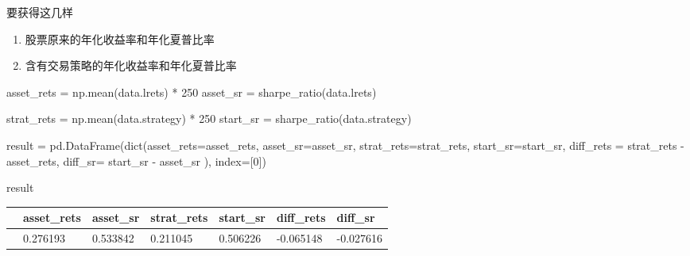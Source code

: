 \documentclass[
  letterpaper,
  DIV=11,
  numbers=noendperiod]{scrreprt}
\newenvironment{Shaded}{\begin{snugshade}}{\end{snugshade}}
\newcommand{\BuiltInTok}[1]{\textcolor[rgb]{0.00,0.23,0.31}{#1}}
\newcommand{\DecValTok}[1]{\textcolor[rgb]{0.68,0.00,0.00}{#1}}
\newcommand{\NormalTok}[1]{\textcolor[rgb]{0.00,0.23,0.31}{#1}}
\newcommand{\OperatorTok}[1]{\textcolor[rgb]{0.37,0.37,0.37}{#1}}
\providecommand{\tightlist}{%
  \setlength{\itemsep}{0pt}\setlength{\parskip}{0pt}}\usepackage{longtable,booktabs,array}
\begin{document}
要获得这几样

\begin{enumerate}
\def\labelenumi{\arabic{enumi}.}
\tightlist
\item
  股票原来的年化收益率和年化夏普比率
\item
  含有交易策略的年化收益率和年化夏普比率
\end{enumerate}

\begin{Shaded}
\begin{Highlighting}[]
\NormalTok{asset\_rets }\OperatorTok{=}\NormalTok{ np.mean(data.lrets) }\OperatorTok{*} \DecValTok{250}
\NormalTok{asset\_sr }\OperatorTok{=}\NormalTok{ sharpe\_ratio(data.lrets)}

\NormalTok{strat\_rets }\OperatorTok{=}\NormalTok{ np.mean(data.strategy) }\OperatorTok{*} \DecValTok{250}
\NormalTok{start\_sr }\OperatorTok{=}\NormalTok{ sharpe\_ratio(data.strategy)}

\NormalTok{result }\OperatorTok{=}\NormalTok{ pd.DataFrame(}\BuiltInTok{dict}\NormalTok{(asset\_rets}\OperatorTok{=}\NormalTok{asset\_rets,}
\NormalTok{                           asset\_sr}\OperatorTok{=}\NormalTok{asset\_sr,}
\NormalTok{                           strat\_rets}\OperatorTok{=}\NormalTok{strat\_rets,}
\NormalTok{                           start\_sr}\OperatorTok{=}\NormalTok{start\_sr,}
\NormalTok{                           diff\_rets }\OperatorTok{=}\NormalTok{ strat\_rets }\OperatorTok{{-}}\NormalTok{ asset\_rets,}
\NormalTok{                           diff\_sr}\OperatorTok{=}\NormalTok{ start\_sr }\OperatorTok{{-}}\NormalTok{ asset\_sr}
\NormalTok{                           ), index}\OperatorTok{=}\NormalTok{[}\DecValTok{0}\NormalTok{])}

\NormalTok{result}
\end{Highlighting}
\end{Shaded}

\begin{longtable}[]{@{}lllllll@{}}
\toprule\noalign{}
& asset\_rets & asset\_sr & strat\_rets & start\_sr & diff\_rets &
diff\_sr \\
\midrule\noalign{}
\endhead
\bottomrule\noalign{}
\endlastfoot
0 & 0.276193 & 0.533842 & 0.211045 & 0.506226 & -0.065148 & -0.027616 \\
\end{longtable}
\end{document}

